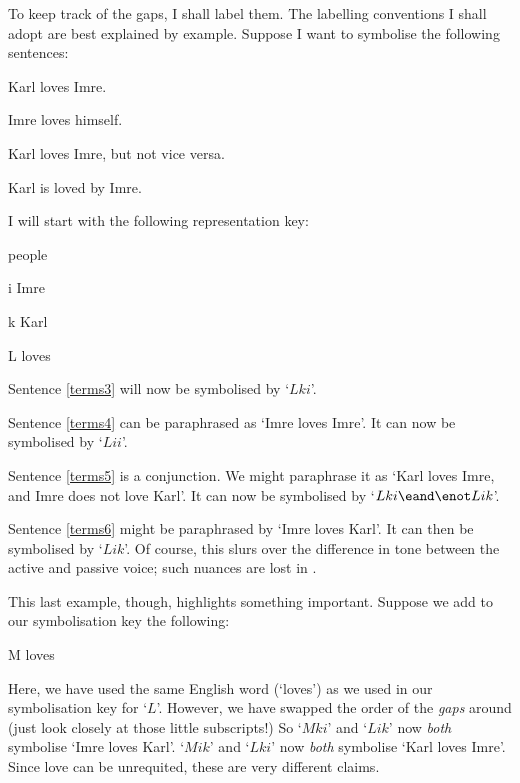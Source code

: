 To keep track of the gaps, I shall label them. The labelling conventions I shall adopt are best explained by example. Suppose I want to symbolise the following sentences:
	\begin{earg}
		\item[\ex{terms3}] Karl loves Imre.
		\item[\ex{terms4}] Imre loves himself.
		\item[\ex{terms5}] Karl loves Imre, but not vice versa.
		\item[\ex{terms6}] Karl is loved by Imre.
	\end{earg}
I will start with the following representation key:
	\begin{ekey}
		\item[\text{domain}] people
		\item[i] Imre
		\item[k] Karl
		\item[L]  loves 
	\end{ekey}
Sentence \ref{terms3} will now be symbolised by `$Lki$'. 

Sentence \ref{terms4} can be paraphrased as `Imre loves Imre'. It can now be symbolised by `$Lii$'. 

Sentence \ref{terms5} is a conjunction. We might paraphrase it as `Karl loves Imre, and Imre does not love Karl'. It can now be symbolised by `$Lki \eand \enot Lik$'. 

Sentence \ref{terms6} might be paraphrased by `Imre loves Karl'. It can then be symbolised by `$Lik$'. Of course, this slurs over the difference in tone between the active and passive voice; such nuances are lost in \FOL. 

This last example, though, highlights something important. Suppose we add to our symbolisation key the following:
	\begin{ekey}
		\item[M]  loves \gap{1}
	\end{ekey}
Here, we have used the same English word (`loves') as we used in our symbolisation key for `$L$'. However, we have swapped the order of the \emph{gaps} around (just look closely at those little subscripts!) So `$Mki$' and `$Lik$' now \emph{both} symbolise `Imre loves Karl'. `$Mik$' and `$Lki$' now \emph{both} symbolise `Karl loves Imre'. Since love can be unrequited, these are very different claims. 

